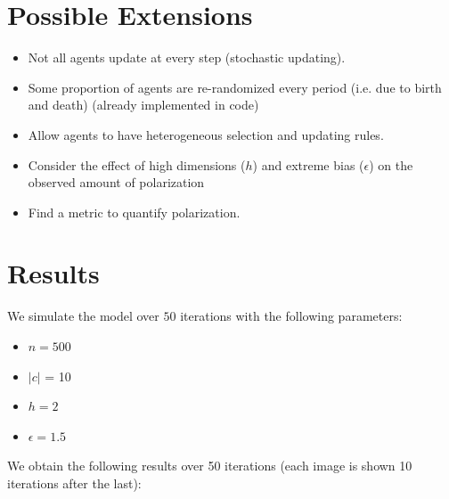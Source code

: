 \documentclass{article}
\begin{document}
\section{Possible Extensions}

\begin{itemize}
    \item Not all agents update at every step (stochastic updating).
    \item Some proportion of agents are re-randomized every period (i.e. due to birth and death) (already implemented in code)
    \item Allow agents to have heterogeneous selection and updating rules.
    \item Consider the effect of high dimensions ($h$) and extreme bias ($\epsilon$) on the observed amount of polarization 
    \item Find a metric to quantify polarization.
\end{itemize}

\section{Results}
We simulate the model over $50$ iterations with the following parameters:

\begin{itemize}
    \item $n = 500$
    \item $|c|$ = 10
    \item $h = 2$
    \item $\epsilon = 1.5$ 
\end{itemize}

We obtain the following results over 50 iterations (each image is shown 10 iterations after the last):
\end{document}

